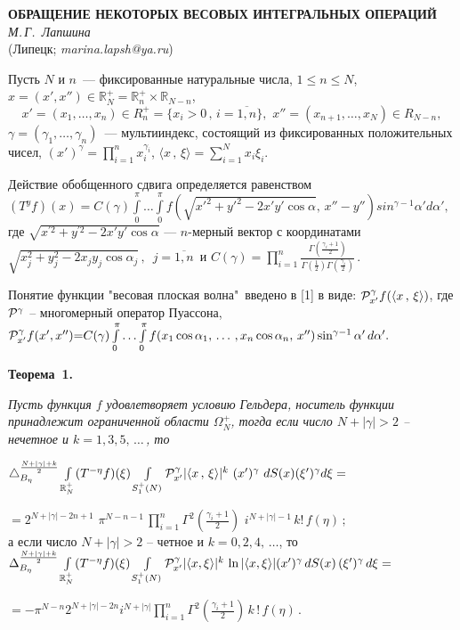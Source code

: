 \begin{center}{
	\bf
	ОБРАЩЕНИЕ НЕКОТОРЫХ ВЕСОВЫХ ИНТЕГРАЛЬНЫХ ОПЕРАЦИЙ
} \\
{\it М.\,Г.~Лапшина } \\
(Липецк; {\it marina.lapsh@ya.ru})
\end{center}


Пусть $N$ и $n$~--- фиксированные натуральные числа, $1\le n\le N $,
$x=(x',x'')\in \mathbb{R}_N^+=\mathbb{R}_n^+\times\mathbb{R}_{N-n}$,
$$x'{=}(x_1,\ldots,x_n)\in R_n^+{=}\{x_i{>}0\,,\, i{=}\overline{1,n}\},\,\,
x''{=}(x_{n+1},\ldots,x_N)\in R_{N{-}n},$$
$\gamma{=}(\gamma_1,\ldots,\gamma_n)$~--- мультииндекс, состоящий из
фиксированных положительных чисел, $(x')^\gamma=\prod_{i=1}^n x_i^{\gamma_i}$,
$\langle x\,,\,\xi\rangle{=}\sum_{i=1}^{N}x_i\xi_i$.

Действие обобщенного сдвига определяется  равенством\\
$
(T^y f)(x){=}C(\gamma)\int\limits_{0}^{\pi}
\ldots \int\limits_{0}^{\pi}
f\left(\sqrt{x'^2{+}y'^2{-}2x'y'\cos\alpha},\,
 x''{-}y''\right)sin^{\gamma-1}\alpha' d\alpha',
$ \\
где $\sqrt{x^{'2}+y^{'2}-2x'y'\cos\alpha}$ --- $n$-мерный вектор  с координатами\\
$\sqrt{x_j^{2}+y_j^{2}-2x_jy_j\cos\alpha_j}\,,\,\,\, j=\overline{1,n}$\, и
$
C(\gamma)=\prod\limits_{i=1}^n\frac{\Gamma\left(\frac{\gamma_i+1}{2}\right)}
{\Gamma\left(\frac{1}{2}\right)\Gamma\left(\frac{\gamma_i}{2}\right)}\,.
$

Понятие функции "весовая плоская волна"\, введено в [1] в виде:
${\cal P}^\gamma_{x'} f(\langle x\,,\,\xi\rangle)$,
где ${\cal P}^\gamma$ -- многомерный оператор Пуассона,\\
$
{\cal P}^\gamma_{x'} f(x',x''){=}C(\gamma)
\int\limits_0^\pi\ldots \int\limits_0^\pi f(x_1\cos\alpha_1,\,\ldots\,,x_n\cos\alpha_n,\,x'')
\sin^{\gamma-1}\alpha'\,d\alpha'.
$

\smallskip
\textbf{Теорема~1.}
{\it Пусть функция $f$ удовлетворяет условию Гельдера, носитель функции принадлежит ограниченной области $\Omega_{N}^+$,
тогда если число $N+|\gamma|>2$ -- нечетное и $k=1,3,5,\,\ldots\,$, то

$
\triangle_{B_{\eta}}^{\frac{N+|\gamma|+k}{2}}
\int\limits_{\mathbb{R}_N^+}(T^{-\eta}f)(\xi)
\int\limits_{S^+_1(N)}{\cal P}_{x'}^\gamma |\langle x\,,\,\xi\rangle|^k\,\,
(x')^\gamma\,\,dS(x)(\xi')^{\gamma} d\xi=
$

$
=2^{N+|\gamma|-2n+1}\,\,
\pi^{N-n-1}\,
\prod\limits_{i=1}^{n}\Gamma^2\left(\frac{\gamma_i+1}{2}\right)
\,\,i^{N+|\gamma|-1}\,k!
\, f(\eta)\,;
$\\
а если
число $N+|\gamma|>2$ -- четное и $k=0,2,4,\,\ldots$, то\\
$
\Delta_{B_{\eta}}^{\frac{N+|\gamma|+k}{2}}\int\limits_{\mathbb{R}_N^+}(T^{-\eta}f)(\xi)
\int\limits_{S_1^+(N)}{\cal P}_{x'}^\gamma |\langle x,\xi \rangle|^k\,\ln|\langle x,\xi \rangle|
(x')^{\gamma}\,dS(x)\,(\xi')^{\gamma}\,d\xi=
$

$
=-\pi^{N-n} 2^{N+|\gamma|-2n} i^{N+|\gamma|}
\prod\limits_{i=1}^{n}\Gamma^2\left(\frac{\gamma_i+1}{2}\right)\,k\,!\,f(\eta)\,.
$}

